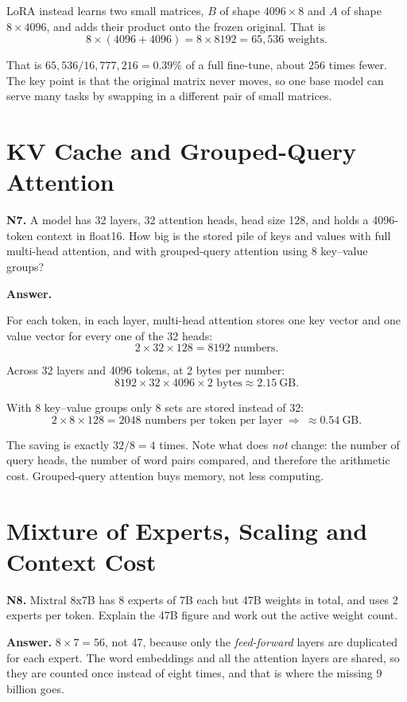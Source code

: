 \documentclass[11pt]{article}
\begin{document}
LoRA instead learns two small matrices, $B$ of shape $4096\times8$ and $A$ of shape
$8\times4096$, and adds their product onto the frozen original. That is
\[
8\times(4096+4096)=8\times8192=65{,}536 \text{ weights}.
\]

That is $65{,}536/16{,}777{,}216=0.39\%$ of a full fine-tune, about $256$ times fewer. The key
point is that the original matrix never moves, so one base model can serve many tasks by
swapping in a different pair of small matrices.

\section{KV Cache and Grouped-Query Attention}

\textbf{N7.} A model has 32 layers, 32 attention heads, head size 128, and holds a 4096-token
context in float16. How big is the stored pile of keys and values with full multi-head
attention, and with grouped-query attention using 8 key--value groups?

\textbf{Answer.}

For each token, in each layer, multi-head attention stores one key vector and one value
vector for every one of the 32 heads:
\[
2\times32\times128=8192 \text{ numbers}.
\]

Across 32 layers and 4096 tokens, at 2 bytes per number:
\[
8192\times32\times4096\times2 \text{ bytes}\approx 2.15\ \text{GB}.
\]

With 8 key--value groups only 8 sets are stored instead of 32:
\[
2\times8\times128=2048 \text{ numbers per token per layer}\ \Rightarrow\ \approx 0.54\ \text{GB}.
\]

The saving is exactly $32/8=4$ times. Note what does \emph{not} change: the number of query
heads, the number of word pairs compared, and therefore the arithmetic cost. Grouped-query
attention buys memory, not less computing.

\section{Mixture of Experts, Scaling and Context Cost}

\textbf{N8.} Mixtral 8x7B has 8 experts of 7B each but 47B weights in total, and uses 2 experts
per token. Explain the 47B figure and work out the active weight count.

\textbf{Answer.} $8\times7=56$, not 47, because only the \emph{feed-forward} layers are
duplicated for each expert. The word embeddings and all the attention layers are shared, so
they are counted once instead of eight times, and that is where the missing 9 billion goes.
\end{document}
